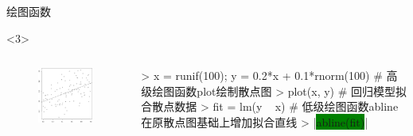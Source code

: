 \documentclass{beamerthemeMono}
\begin{document}
\begin{frame}[t,fragile]{\subsecname}{绘图函数}
\begin{overlayarea}{\textwidth}{\textheight}
\begin{onlyenv}<3>
\begin{columns}
        \begin{column}{.4\textwidth}
          \begin{figure}
            \centering
            \includegraphics[width=\columnwidth]{低级绘图函数.png}
          \end{figure}
        \end{column}

        \begin{column}{.6\textwidth}
 \centering
\begin{rcode}
> x = runif(100); y = 0.2*x + 0.1*rnorm(100)
# 高级绘图函数plot绘制散点图
> plot(x, y)
# 回归模型拟合散点数据
> fit = lm(y ~ x)
# 低级绘图函数abline在原散点图基础上增加拟合直线
> |\colorbox{green}{abline(fit)}|
\end{rcode}
        \end{column}
      \end{columns}
\end{onlyenv}
\end{overlayarea}  
\end{frame}
\end{document}
